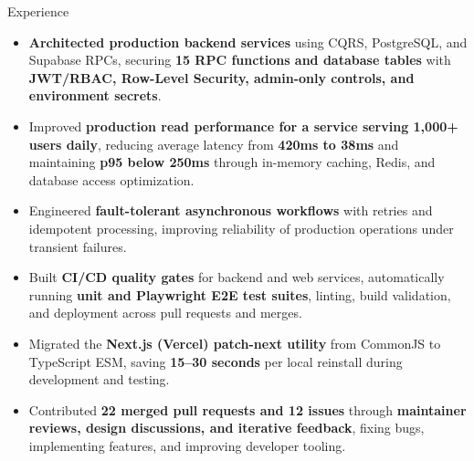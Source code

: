 \documentclass{resume}
\begin{document}
\begin{experienceSection}{Experience}


    \experienceItem[
        company={\textbf{Aarogya Kaya} | Remote | Software Engineer Intern},
        location={},
        position={},
        duration={July 2025 - January 2026}
    ]

    \begin{itemize}
        \itemsep -6pt {}

        \item \textbf{Architected production backend services} using CQRS, PostgreSQL, and Supabase RPCs, securing \textbf{15 RPC functions and database tables} with \textbf{JWT/RBAC, Row-Level Security, admin-only controls, and environment secrets}.

        \item Improved \textbf{production read performance for a service serving 1,000+ users daily}, reducing average latency from \textbf{420ms to 38ms} and maintaining \textbf{p95 below 250ms} through in-memory caching, Redis, and database access optimization.

        \item Engineered \textbf{fault-tolerant asynchronous workflows} with retries and idempotent processing, improving reliability of production operations under transient failures.

        \item Built \textbf{CI/CD quality gates} for backend and web services, automatically running \textbf{unit and Playwright E2E test suites}, linting, build validation, and deployment across pull requests and merges.

    \end{itemize}



    \experienceItem[
        company={\textbf{Open Source} | Remote | Software Contributor},
        location={},
        position={},
        duration={July 2025 - May 2026}
    ]

    \begin{itemize}
        \itemsep -6pt {}

        \item Migrated the \textbf{Next.js (Vercel) patch-next utility} from CommonJS to TypeScript ESM, saving \textbf{15--30 seconds} per local reinstall during development and testing.

        \item Contributed \textbf{22 merged pull requests and 12 issues} through \textbf{maintainer reviews, design discussions, and iterative feedback}, fixing bugs, implementing features, and improving developer tooling.

    \end{itemize}

\end{experienceSection}
\end{document}
